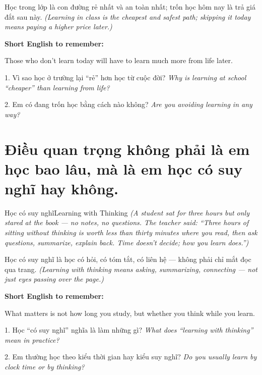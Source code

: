 \begin{baihoc}
Học trong lớp là con đường rẻ nhất và an toàn nhất; trốn học hôm nay là trả giá đắt sau này.
\textit{(Learning in class is the cheapest and safest path; skipping it today means paying a higher price later.)}
\end{baihoc}

\begin{ghinhoanh}
\textbf{Short English to remember:}

Those who don't learn today will have to learn much more from life later.

\end{ghinhoanh}

\begin{tuhocnhanh}
1. Vì sao học ở trường lại ``rẻ'' hơn học từ cuộc đời? \textit{Why is learning at school ``cheaper'' than learning from life?}

2. Em có đang trốn học bằng cách nào không? \textit{Are you avoiding learning in any way?}
\end{tuhocnhanh}
\ngancach

\section{Điều quan trọng không phải là em học bao lâu, mà là em học có suy nghĩ hay không.}
\begin{truyen}{Học có suy nghĩ}{Learning with Thinking}
\textit{(A student sat for three hours but only stared at the book — no notes, no questions. The teacher said: ``Three hours of sitting without thinking is worth less than thirty minutes where you read, then ask questions, summarize, explain back. Time doesn't decide; how you learn does.'')}
\end{truyen}

\begin{baihoc}
Học có suy nghĩ là học có hỏi, có tóm tắt, có liên hệ — không phải chỉ mắt đọc qua trang.
\textit{(Learning with thinking means asking, summarizing, connecting — not just eyes passing over the page.)}
\end{baihoc}

\begin{ghinhoanh}
\textbf{Short English to remember:}

What matters is not how long you study, but whether you think while you learn.

\end{ghinhoanh}

\begin{tuhocnhanh}
1. Học ``có suy nghĩ'' nghĩa là làm những gì? \textit{What does ``learning with thinking'' mean in practice?}

2. Em thường học theo kiểu thời gian hay kiểu suy nghĩ? \textit{Do you usually learn by clock time or by thinking?}
\end{tuhocnhanh}
\ngancach
